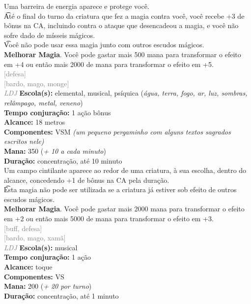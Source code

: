 \documentclass{RPG_Adventure}[2021/10/20]
\begin{document}
{\normalsize Uma barreira de energia aparece e protege você.\\\t Até o final do turno da criatura que fez a magia contra você, você recebe +3 de bônus na CA, incluindo contra o ataque que desencadeou a magia, e você não sofre dado de mísseis mágicos.\\\t Você não pode usar essa magia junto com outros escudos mágicos.\\\t \textbf{Melhorar Magia}. Você pode gastar mais 500 mana para transformar o efeito em +4 ou então mais 2000 de mana para transformar o efeito em +5.\\}
{\scriptsize \textcolor{gray}{[defesa]\\}}
{\scriptsize \textcolor{gray}{[bardo, mago, monge]\\}}
{\tiny \textcolor{gray}{\textit{LDJ}}}\jump{}
{\small \t \textbf{Escola(s):} elemental, musical, psíquica (\textit{água, terra, fogo, ar, luz, sombras, relâmpago, metal, veneno})\\\t \textbf{Tempo conjuração:} 1 ação bônus\\\t \textbf{Alcance:} 18 metros\\\t \textbf{Componentes:} VSM \textit{(um pequeno pergaminho com alguns textos sagrados escritos nele)}\\\t \textbf{Mana:} 350 (\textit{+ 10 a cada minuto})\\\t \textbf{Duração:} concentração, até 10 minuto\\}
{\normalsize Um campo cintilante aparece ao redor de uma criatura, à sua escolha, dentro do alcance, concedendo +1 de bônus na CA pela duração.\\\t Esta magia não pode ser utilizada se a criatura já estiver sob efeito de outros escudos mágicos.\\\t \textbf{Melhorar Magia}. Você pode gastar mais 2000 mana para transformar o efeito em +2 ou então mais 5000 de mana para transformar o efeito em +3.\\}
{\scriptsize \textcolor{gray}{[buff, defesa]\\}}
{\scriptsize \textcolor{gray}{[bardo, mago, xamã]\\}}
{\tiny \textcolor{gray}{\textit{LDJ}}}\jump{}
{\small \t \textbf{Escola(s):} musical\\\t \textbf{Tempo conjuração:} 1 ação\\\t \textbf{Alcance:} toque\\\t \textbf{Componentes:} VS\\\t \textbf{Mana:} 200 (\textit{+ 20 por turno})\\\t \textbf{Duração:} concentração, até 1 minuto\\}
\end{document}
